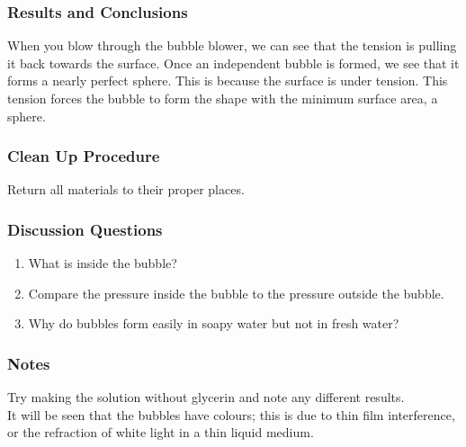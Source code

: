 \subsubsection*{Results and Conclusions}
When you blow through the bubble blower, we can see that the tension is pulling it back towards the surface. Once an independent bubble is formed, we see that it forms a nearly perfect sphere. This is because the surface is under tension. This tension forces the bubble to form the shape with the minimum surface area, a sphere.

\subsubsection*{Clean Up Procedure}
Return all materials to their proper places.

\subsubsection*{Discussion Questions}
\begin{enumerate}
\item{What is inside the bubble?}
\item{Compare the pressure inside the bubble to the pressure outside the bubble.}
\item{Why do bubbles form easily in soapy water but not in fresh water?}
\end{enumerate}

\subsubsection*{Notes}
Try making the solution without glycerin and note any different results.\\
It will be seen that the bubbles have colours; this is due to thin film interference, or the refraction of white light in a thin liquid medium.


